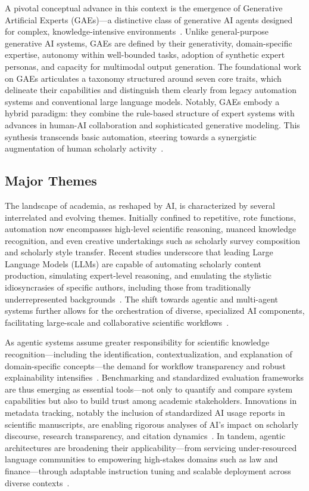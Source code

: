 \documentclass[11pt]{article}
\begin{document}
A pivotal conceptual advance in this context is the emergence of Generative Artificial Experts (GAEs)—a distinctive class of generative AI agents designed for complex, knowledge-intensive environments~\cite{ref16}. Unlike general-purpose generative AI systems, GAEs are defined by their generativity, domain-specific expertise, autonomy within well-bounded tasks, adoption of synthetic expert personas, and capacity for multimodal output generation. The foundational work on GAEs articulates a taxonomy structured around seven core traits, which delineate their capabilities and distinguish them clearly from legacy automation systems and conventional large language models. Notably, GAEs embody a hybrid paradigm: they combine the rule-based structure of expert systems with advances in human-AI collaboration and sophisticated generative modeling. This synthesis transcends basic automation, steering towards a synergistic augmentation of human scholarly activity~\cite{ref16}.

\subsection{Major Themes}

The landscape of academia, as reshaped by AI, is characterized by several interrelated and evolving themes. Initially confined to repetitive, rote functions, automation now encompasses high-level scientific reasoning, nuanced knowledge recognition, and even creative undertakings such as scholarly survey composition and scholarly style transfer. Recent studies underscore that leading Large Language Models (LLMs) are capable of automating scholarly content production, simulating expert-level reasoning, and emulating the stylistic idiosyncrasies of specific authors, including those from traditionally underrepresented backgrounds~\cite{ref102,ref104}. The shift towards agentic and multi-agent systems further allows for the orchestration of diverse, specialized AI components, facilitating large-scale and collaborative scientific workflows~\cite{ref16,ref106}.

As agentic systems assume greater responsibility for scientific knowledge recognition—including the identification, contextualization, and explanation of domain-specific concepts—the demand for workflow transparency and robust explainability intensifies~\cite{ref106}. Benchmarking and standardized evaluation frameworks are thus emerging as essential tools—not only to quantify and compare system capabilities but also to build trust among academic stakeholders. Innovations in metadata tracking, notably the inclusion of standardized AI usage reports in scientific manuscripts, are enabling rigorous analyses of AI’s impact on scholarly discourse, research transparency, and citation dynamics~\cite{ref101,ref105}. In tandem, agentic architectures are broadening their applicability—from servicing under-resourced language communities to empowering high-stakes domains such as law and finance—through adaptable instruction tuning and scalable deployment across diverse contexts~\cite{ref103,ref104,ref105,ref106,ref111}.
\end{document}
